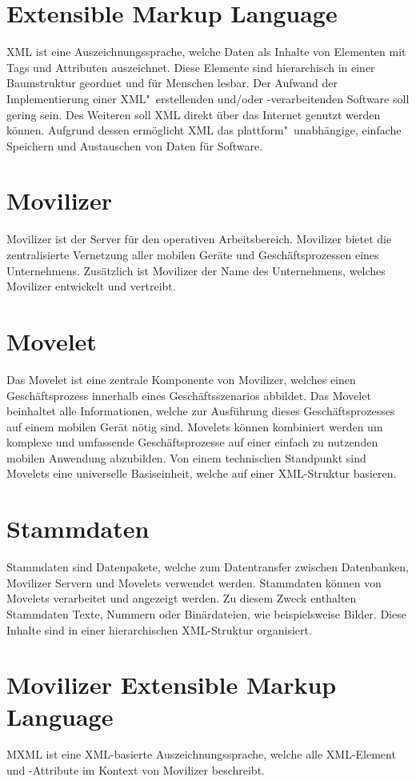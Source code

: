 \section{Extensible Markup Language}
\ac{XML} ist eine Auszeichnungssprache, welche Daten als Inhalte von Elementen mit Tags und Attributen auszeichnet. Diese Elemente sind hierarchisch in einer Baumstruktur geordnet und für Menschen lesbar. Der Aufwand der Implementierung einer \ac{XML}"~erstellenden und/oder -verarbeitenden Software soll gering sein. Des Weiteren soll \ac{XML} direkt über das Internet genutzt werden können. Aufgrund dessen ermöglicht \ac{XML} das plattform"~unabhängige, einfache Speichern und Austauschen von Daten für Software.
\autocite[Vgl.][]{Bray.2008}
\section{Movilizer}
Movilizer ist der Server für den operativen Arbeitsbereich. Movilizer bietet die zentralisierte Vernetzung aller mobilen Geräte und Geschäftsprozessen eines Unternehmens. Zusätzlich ist Movilizer der Name des Unternehmens, welches Movilizer entwickelt und vertreibt.
\autocite[Vgl.][]{Nitschkowski.2018c}
\section{Movelet}
Das Movelet ist eine zentrale Komponente von Movilizer, welches einen Geschäftsprozess innerhalb eines Geschäftsszenarios abbildet. Das Movelet beinhaltet alle Informationen, welche zur Ausführung dieses Geschäftsprozesses auf einem mobilen Gerät nötig sind. Movelets können kombiniert werden um komplexe und umfassende Geschäftsprozesse auf einer einfach zu nutzenden mobilen Anwendung abzubilden. Von einem technischen Standpunkt sind Movelets eine universelle Basiseinheit, welche auf einer XML-Struktur basieren.
\autocite[Vgl.][]{Nitschkowski.2018c}
\section{Stammdaten}
Stammdaten sind Datenpakete, welche zum Datentransfer zwischen Datenbanken, Movilizer Servern und Movelets verwendet werden. Stammdaten können von Movelets verarbeitet und angezeigt werden. Zu diesem Zweck enthalten Stammdaten Texte, Nummern oder Binärdateien, wie beispielsweise Bilder. Diese Inhalte sind in einer hierarchischen \ac{XML}-Struktur organisiert.
\autocite[Vgl.][]{Nfitschkowski.2018d}
\section{Movilizer Extensible Markup Language}
\ac{MXML} ist eine \ac{XML}-basierte Auszeichnungssprache, welche alle XML-Element und -Attribute im Kontext von Movilizer beschreibt.
\autocite[Vgl.][]{Nitschkowski.2015}
